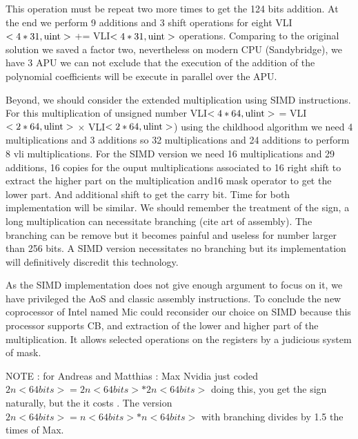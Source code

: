 \documentclass[11pt]{amsart}
\begin{document}
This operation must be repeat two more times to get the 124 bits addition. At the end we perform 9 additions and 3  shift operations for eight VLI$<4*31, \texttt{\textrm{uint}}>$ += VLI$<4*31, \texttt{\textrm{uint}}>$ operations. 
 Comparing to the original solution we saved a factor two,  nevertheless on modern CPU (Sandybridge), we have 3 APU  we can not exclude that the execution of  the addition of the polynomial coefficients will be execute in parallel over the APU. 

Beyond, we should consider the extended  multiplication using SIMD instructions. For this multiplication of unsigned number   VLI$<4*64, \texttt{\textrm{ulint}}>$  = VLI$<2*64, \texttt{\textrm{ulint}}>$ $\times$ VLI$<2*64, \texttt{\textrm{ulint}}>$) using the
childhood  algorithm we need 4 multiplications and 3 additions so 32 multiplications and 24 additions to perform 8 vli multiplications. For the SIMD version we need 16 multiplications and 29 additions, 16 copies for the ouput multiplications 
associated to 16 right shift  to extract the higher part on the multiplication and16 mask operator to get the lower part. And additional shift to get the carry bit. Time for both implementation will be similar. We should remember the treatment of the sign,
 a long multiplication can necessitate branching (cite art of assembly). The branching can be remove but it  becomes painful and useless for number larger than 256 bits.  A SIMD version necessitates no branching but its implementation will
definitively discredit this technology.

As the SIMD implementation does not give enough argument to focus on it, we have privileged  the AoS and classic assembly instructions. To conclude the new coprocessor of Intel named Mic could reconsider our choice on SIMD
because this processor supports CB, and extraction of the  lower and higher part of the multiplication. It allows selected operations on the registers by a judicious system of mask.

NOTE :  for Andreas and Matthias :
Max Nvidia just coded $2n <64 bits> =  2n <64 bits>* 2n <64 bits> $ doing this, you get the sign naturally, but the it costs . The version  $2n <64 bits> =  n <64 bits> * n <64 bits>$ with branching divides by 1.5 the times of Max.
\end{document}
